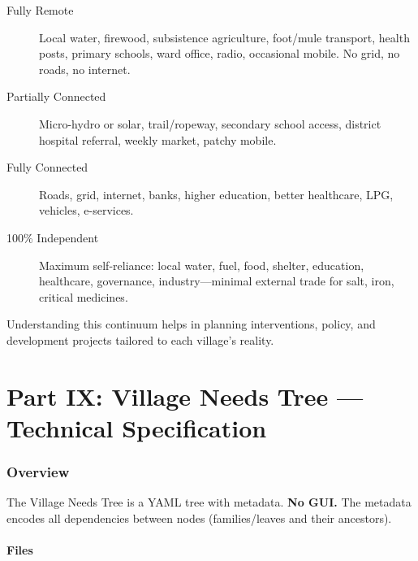 \documentclass[11pt,a4paper]{article}
\begin{document}
\begin{description}
    \item[Fully Remote] Local water, firewood, subsistence agriculture, foot/mule transport, health posts, primary schools, 
    ward office, radio, occasional mobile. No grid, no roads, no internet.
    \item[Partially Connected] Micro-hydro or solar, trail/ropeway, secondary school access, district hospital referral, weekly market, patchy mobile.
    \item[Fully Connected] Roads, grid, internet, banks, higher education, better healthcare, LPG, vehicles, e-services.
    \item[100\% Independent] Maximum self-reliance: local water, fuel, food, shelter, education, healthcare, 
    governance, industry---minimal external trade for salt, iron, critical medicines.
\end{description}

Understanding this continuum helps in planning interventions, policy, and development projects tailored to each village's reality.

\part{Part IX: Village Needs Tree --- Technical Specification}


\section{Overview}

The Village Needs Tree is a YAML tree with metadata. \textbf{No GUI.} The metadata encodes all dependencies between nodes (families/leaves and their ancestors).

\subsection{Files}
\end{document}
